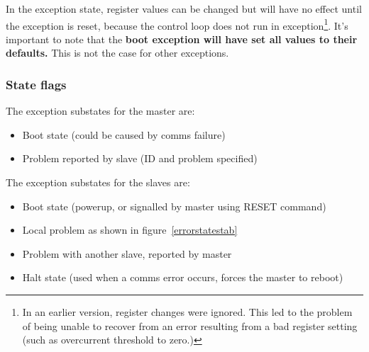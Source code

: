 In the exception state, register values can be changed but will have no effect
until the exception is reset, because the control loop does not run in
exception\footnote{In an earlier version, register changes were ignored. This
led to the problem of being unable to recover from an error resulting from a
bad register setting (such as overcurrent threshold to zero.)}. It's important
to note that the \textbf{boot exception will have set all values to their
defaults.} This is not the case for other exceptions.


\subsubsection{State flags}
The exception substates for the master are:
\begin{itemize}
\item Boot state (could be caused by \isqc{} comms failure)
\item Problem reported by slave (ID and problem specified)
\end{itemize}
The exception substates for the slaves are:
\begin{itemize}
\item Boot state (powerup, or signalled by master using RESET command)
\item Local problem as shown in figure~\ref{errorstatestab}
\item Problem with another slave, reported by master
\item Halt state (used when a comms error occurs, forces the master to reboot)
\end{itemize}

